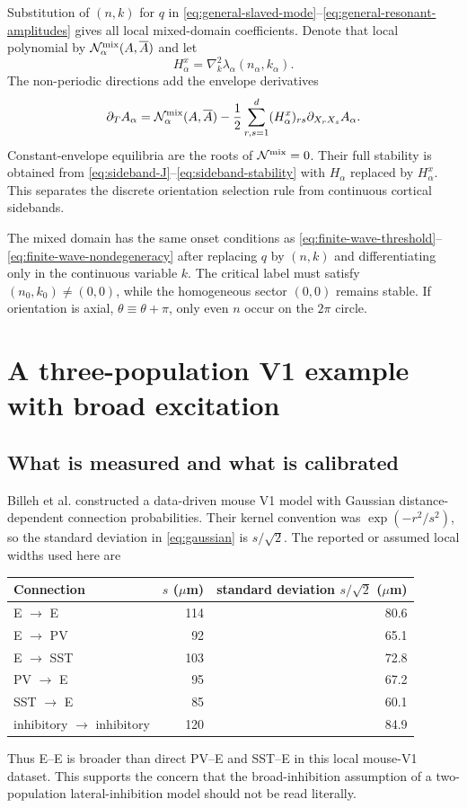 \documentclass[11pt]{article}
\begin{document}
Substitution of $(n,k)$ for $q$ in
\eqref{eq:general-slaved-mode}--\eqref{eq:general-resonant-amplitudes} gives
all local mixed-domain coefficients.  Denote that local polynomial by
$\mathcal N_\alpha^{\rm mix}(A,\overline A)$ and let
\begin{equation}
 H_\alpha^x=
 \nabla_k^2\lambda_\alpha(n_\alpha,k_\alpha).
 \label{eq:mixed-Hessian}
\end{equation}
The non-periodic directions add the envelope derivatives
\begin{equation}
 \partial_TA_\alpha
 =\mathcal N_\alpha^{\rm mix}(A,\overline A)
 -\frac12\sum_{r,s=1}^d(H_\alpha^x)_{rs}
 \partial_{X_rX_s}A_\alpha.
 \label{eq:mixed-envelope}
\end{equation}
Constant-envelope equilibria are the roots of
$\mathcal N^{\rm mix}=0$.  Their full stability is obtained from
\eqref{eq:sideband-J}--\eqref{eq:sideband-stability} with $H_\alpha$
replaced by $H_\alpha^x$.  This separates the discrete orientation
selection rule from continuous cortical sidebands.

The mixed domain has the same onset conditions as
\eqref{eq:finite-wave-threshold}--\eqref{eq:finite-wave-nondegeneracy} after
replacing $q$ by $(n,k)$ and differentiating only in the continuous variable
$k$.  The critical label must satisfy $(n_0,k_0)\ne(0,0)$, while the
homogeneous sector $(0,0)$ remains stable.  If orientation is axial,
$\theta\equiv\theta+\pi$, only even $n$ occur on the $2\pi$ circle.

\section{A three-population V1 example with broad excitation}

\subsection{What is measured and what is calibrated}

Billeh et al. constructed a data-driven mouse V1 model with Gaussian
distance-dependent connection probabilities.  Their kernel convention was
$\exp(-r^2/s^2)$, so the standard deviation in \eqref{eq:gaussian} is
$s/\sqrt2$.  The reported or assumed local widths used here are
\begin{center}
\begin{tabular}{@{}lrr@{}}
\toprule
Connection & $s$ ($\mu$m) & standard deviation $s/\sqrt2$ ($\mu$m)\\
\midrule
E $\to$ E   & 114 & 80.6\\
E $\to$ PV  & 92  & 65.1\\
E $\to$ SST & 103 & 72.8\\
PV $\to$ E  & 95  & 67.2\\
SST $\to$ E & 85  & 60.1\\
inhibitory $\to$ inhibitory & 120 & 84.9\\
\bottomrule
\end{tabular}
\end{center}
Thus E--E is broader than direct PV--E and SST--E in this local mouse-V1
dataset.  This supports the concern that the broad-inhibition assumption of a
two-population lateral-inhibition model should not be read literally.
\end{document}
